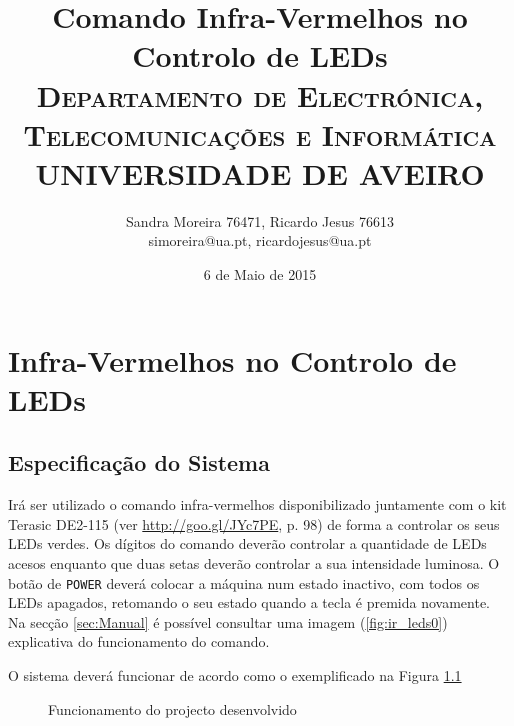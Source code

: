 \documentclass[a4paper,11pt,openright,oneside]{report}
\begin{document}
\title{\textbf{Comando Infra-Vermelhos no Controlo de LEDs}\\[1cm]\textsc{\small {Departamento de Electrónica, Telecomunicações e Informática} \\ \large {UNIVERSIDADE DE AVEIRO}}}
\author{Sandra Moreira 76471, Ricardo Jesus 76613\\simoreira@ua.pt, ricardojesus@ua.pt}
\date{6 de Maio de 2015}
\maketitle
{}

\chapter{Infra-Vermelhos no Controlo de LEDs}

\section{Especificação do Sistema}
\label{sec:especificação}

Irá ser utilizado o comando infra-vermelhos disponibilizado juntamente com o kit Terasic DE2-115 (ver \url{http://goo.gl/JYc7PE}, p. 98) de forma a controlar os seus LEDs verdes. Os dígitos do comando deverão controlar a quantidade de LEDs acesos enquanto que duas setas deverão controlar a sua intensidade luminosa. O botão de \verb|POWER| deverá colocar a máquina num estado inactivo, com todos os LEDs apagados, retomando o seu estado quando a tecla é premida novamente. Na secção \ref{sec:Manual} é possível consultar uma imagem (\ref{fig:ir_leds0}) explicativa do funcionamento do comando. 

O sistema deverá funcionar de acordo como o exemplificado na Figura \ref{fig:ir_leds1}

\begin{figure}[ht]
\center
{}
\caption{Funcionamento do projecto desenvolvido}
\label{fig:ir_leds1}
\end{figure}
\end{document}
